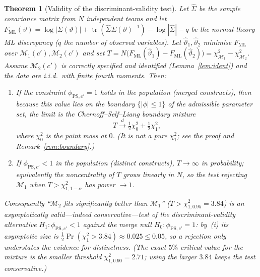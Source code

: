 \documentclass{amsart}
\newtheorem{theorem}{Theorem}
\theoremstyle{remark}
\begin{document}
\begin{theorem}[Validity of the discriminant-validity test]\label{thm:diff}
Let $\hat\Sigma$ be the sample covariance matrix from $N$ independent teams and let
$F_{\mathrm{ML}}(\vartheta)=\log|\Sigma(\vartheta)|+\operatorname{tr}(\hat\Sigma\Sigma(\vartheta)^{-1})
-\log|\hat\Sigma|-q$ be the normal-theory ML discrepancy ($q$ the number of observed
variables). Let $\hat\vartheta_1,\hat\vartheta_2$ minimise $F_{\mathrm{ML}}$ over
$\mathcal M_1(c'),\mathcal M_2(c')$ and set
$T=N\big(F_{\mathrm{ML}}(\hat\vartheta_1)-F_{\mathrm{ML}}(\hat\vartheta_2)\big)
=\chi^2_{\mathcal M_1}-\chi^2_{\mathcal M_2}$.
Assume $\mathcal M_2(c')$ is correctly specified and identified
(Lemma~\ref{lem:ident}) and the data are i.i.d.\ with finite fourth moments. Then:
\begin{enumerate}
\item[(i)] If the constraint $\phi_{\mathrm{PS},c'}=1$ holds in the population
(merged constructs), then because this value lies on the \emph{boundary}
$\{|\phi|\le1\}$ of the admissible parameter set, the limit is the
Chernoff--Self--Liang boundary mixture
\[
T\xrightarrow{d}\tfrac12\chi^2_0+\tfrac12\chi^2_1,
\]
where $\chi^2_0$ is the point mass at $0$. (It is \emph{not} a pure $\chi^2_1$;
see the proof and Remark~\ref{rem:boundary}.)
\item[(ii)] If $\phi_{\mathrm{PS},c'}<1$ in the population (distinct constructs),
$T\to\infty$ in probability; equivalently the noncentrality of $T$ grows linearly
in $N$, so the test rejecting $\mathcal M_1$ when $T>\chi^2_{1,1-\alpha}$ has power
$\to1$.
\end{enumerate}
Consequently ``$\mathcal M_2$ fits significantly better than $\mathcal M_1$''
($T>\chi^2_{1,0.95}=3.84$) is an asymptotically valid---indeed
\emph{conservative}---test of the discriminant-validity alternative
$H_1:\phi_{\mathrm{PS},c'}<1$ against the merge null $H_0:\phi_{\mathrm{PS},c'}=1$:
by~(i) its asymptotic size is $\tfrac12\Pr(\chi^2_1>3.84)\approx0.025\le0.05$, so a
rejection only \emph{understates} the evidence for distinctness. (The exact
$5\%$ critical value for the mixture is the smaller threshold
$\chi^2_{1,0.90}=2.71$; using the larger $3.84$ keeps the test conservative.)
\end{theorem}
\end{document}
